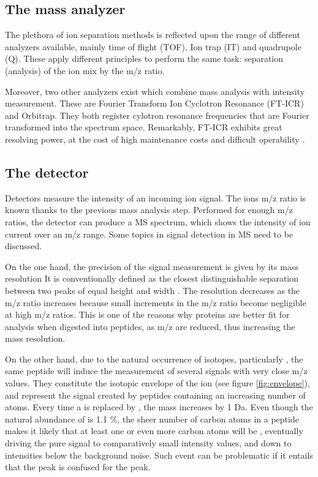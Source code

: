 \documentclass[11pt, a4paper]{report}
\begin{document}
\subsection{The mass analyzer}
\label{subsec:the_mass_analyzer}

The plethora of ion separation methods is reflected upon the range of different analyzers available, mainly time of flight (\ac{TOF}), Ion trap (\ac{IT}) and quadrupole (\ac{Q}). These apply different principles to perform the same task: separation (analysis) of the ion mix by the \ac{m/z} ratio.

Moreover, two other analyzers exist which combine mass analysis with intensity measurement. These are Fourier Transform Ion Cyclotron Resonance (\ac{FT-ICR}) and Orbitrap. They both register cylotron resonance frequencies that are Fourier transformed into the spectrum space. Remarkably, \ac{FT-ICR} exhibits great resolving power, at the cost of high maintenance costs and difficult operability \cite{Barsnes2008}. 

\subsection{The detector}
\label{subsec:the_detector}

Detectors measure the intensity of an incoming ion signal. The ion\textquotesingle s \ac{m/z} ratio is known thanks to the previous mass analysis step. Performed for enough \ac{m/z} ratios, the detector can produce a \ac{MS} spectrum, which shows the intensity of ion current over an \ac{m/z} range. Some topics in signal detection in \ac{MS} need to be discussed.

On the one hand, the precision of the signal measurement is given by its mass resolution It is conventionally defined as the closest distinguishable separation between two peaks of equal height and width \cite{Marshall2013}. The resolution decreases as the \ac{m/z} ratio increases because small increments in the \ac{m/z} ratio become negligible at high \ac{m/z} ratios. This is one of the reasons why proteins are better fit for analysis when digested into peptides, as \ac{m/z} are reduced, thus increasing the mass resolution.

On the other hand, due to the natural occurrence of isotopes, particularly , the same peptide will induce the measurement of several signals with very close \ac{m/z} values. They constitute the isotopic envelope of the ion (see figure \ref{fig:envelope}), and represent the signal created by peptides containing an increasing number of  atoms. Every time a  is replaced by , the mass increases by 1 Da. Even though the natural abundance of  is 1.1 \%, the sheer number of carbon atoms in a peptide makes it likely that at least one or even more carbon atoms will be , eventually driving the pure  signal to comparatively small intensity values, and down to intensities below the background noise. Such event can be problematic if it entails that the  peak is confused for the  peak.
\end{document}
